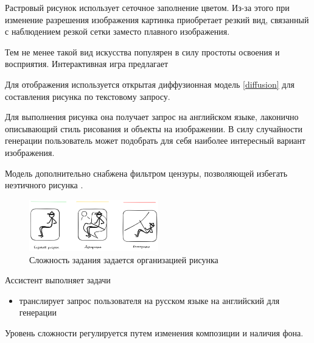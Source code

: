 Растровый рисунок использует сеточное заполнение цветом. Из-за этого при изменение разрешения изображения картинка приобретает
резкий вид, связанный с наблюдением резкой сетки заместо плавного изображения.

Тем не менее такой вид искусства популярен в силу простоты освоения и восприятия. Интерактивная игра предлагает 

Для отображения используется открытая диффузионная модель \ref{diffusion} для составления рисунка по текстовому запросу. 



Для выполнения рисунка она получает запрос на английском языке, лаконично описывающий стиль рисования и объекты на изображении.
В силу случайности генерации пользователь может подобрать для себя наиболее интересный вариант изображения.

Модель дополнительно снабжена фильтром цензуры, позволяющей избегать неэтичного рисунка \cite{radford2021learning}.

\begin{figure}[h]
    \centering
    \includegraphics[width=0.5\textwidth]{assets/work/games/draw.excalidraw.png}
    \caption{Сложность задания задается организацией рисунка}
    \label{draw}
\end{figure}


Ассистент выполняет задачи \begin{itemize}
    \item транслирует запрос пользователя на русском языке на английский для генерации
\end{itemize}



Уровень сложности регулируется путем изменения композиции и наличия фона.



